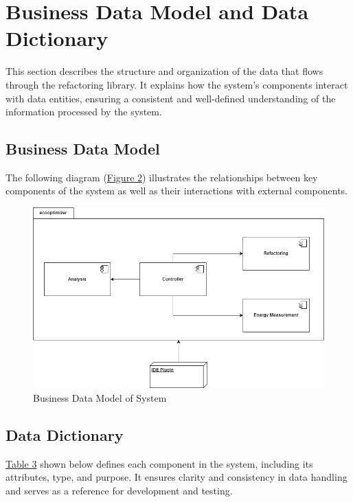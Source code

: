 \documentclass[12pt]{article}
\begin{document}
\newpage
\section{Business Data Model and Data Dictionary}

This section describes the structure and organization of the data
that flows through the refactoring library. It explains how the
system's components interact with data entities, ensuring a
consistent and well-defined understanding of the information
processed by the system.

\subsection{Business Data Model}
The following diagram (\hyperref[img:bdata-model]{Figure 2})
illustrates the relationships between key components of the system as
well as their interactions with external components.

\begin{figure}[H]
  \centering
  \includegraphics[width=\textwidth]{../Images/business-data-model.png}
  \caption{Business Data Model of System}
  \label{img:bdata-model}
\end{figure}

\newpage
\subsection{Data Dictionary}
\hyperref[tab:data-dict]{Table 3} shown below defines each component
in the system, including its attributes, type, and purpose. It
ensures clarity and consistency in data handling and serves as a
reference for development and testing.
\end{document}
